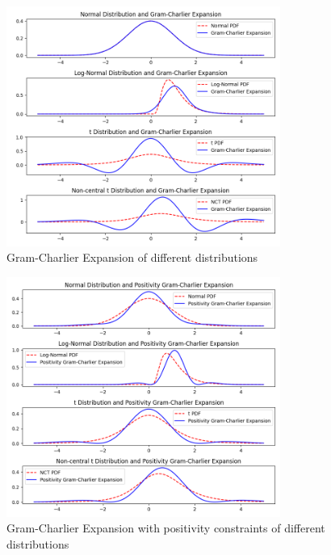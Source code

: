 \begin{figure}[h]
    \centering
    \includegraphics[width=0.8\textwidth]{img/gc_expansion.png}
    \caption{Gram-Charlier Expansion of different distributions}
    \label{fig:gc_expansion}
\end{figure}

\begin{figure}[h]
    \centering
    \includegraphics[width=0.8\textwidth]{img/gc_positivity_expansion.png}
    \caption{Gram-Charlier Expansion with positivity constraints of different distributions}
    \label{fig:gc_positivity_expansion}
\end{figure}

